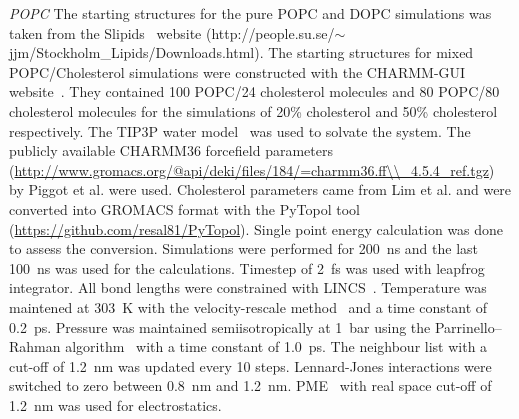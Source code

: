 \documentclass[pre,aps,floatfix,authordate1-4,twocolumn]{revtex4-1}
\begin{document}
{\it POPC}
The starting structures for the pure POPC and DOPC simulations was taken from the Slipids~\cite{jambeck12b} website (http://people.su.se/$\sim$jjm/Stockholm\_Lipids/Downloads.html).
The starting structures for mixed POPC/Cholesterol simulations were constructed with the CHARMM-GUI website~\cite{jo08}. 
They contained 100 POPC/24 cholesterol molecules and 80 POPC/80 cholesterol molecules for
the simulations of 20\% cholesterol and 50\% cholesterol respectively. The TIP3P water model~\cite{jorgensen83} was used to
solvate the system.
The publicly available CHARMM36 forcefield parameters (\url{http://www.gromacs.org/@api/deki/files/184/=charmm36.ff\\\_4.5.4\_ref.tgz}) 
by Piggot et al. \cite{piggot12} were used. Cholesterol parameters came
from Lim et al. \cite{lim12} and were converted into GROMACS format with the PyTopol tool (\url{https://github.com/resal81/PyTopol}).  
Single point energy calculation was done to assess the conversion. 
Simulations were performed for 200~ns and the last 100~ns was used for the calculations. Timestep of 2~fs was
used with leapfrog integrator. All bond lengths were constrained with LINCS~\cite{hess97,hess07}. Temperature was maintened at
303~K with the velocity-rescale method~\cite{bussi07} and a time constant of 0.2~ps. Pressure was maintained semiisotropically
at 1~bar using the Parrinello--Rahman algorithm~\cite{parrinello81} with a time constant of 1.0~ps. The neighbour list with a cut-off of 1.2~nm
was updated every 10 steps. Lennard-Jones interactions were switched to zero
between 0.8~nm and 1.2~nm. PME~\cite{darden93,essman95} with real space cut-off of 1.2~nm was used for electrostatics.
\end{document}
